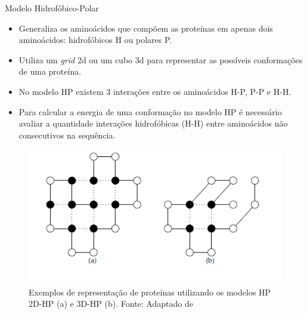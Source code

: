 

\begin{frame}[allowframebreaks]{Modelo Hidrofóbico-Polar}
	

		\begin{itemize}
			\item Generaliza os aminoácidos que compõem as proteínas em apenas dois aminoácidos: hidrofóbicos H ou polares P.
			\item Utiliza um \textit{grid} 2d ou um cubo 3d para representar as possíveis conformações de uma proteína.
			\item No modelo HP existem 3 interações entre os aminoácidos H-P, P-P e H-H.
			\item Para calcular a energia de uma conformação no modelo HP é necessário avaliar a quantidade interações hidrofóbicas (H-H) entre aminoácidos não consecutivos na sequência.
		\end{itemize}
		
		\begin{figure}[!htb]
			\centering
			\includegraphics[scale=.8]{figuras/modeloHPExemplo.png}
			\caption{Exemplos de representação de proteínas utilizando os modelos HP 2D-HP (a) e 3D-HP (b). Fonte: Adaptado de }
			\label{fig:exemploModeloHP}
		\end{figure}

\end{frame}

	
